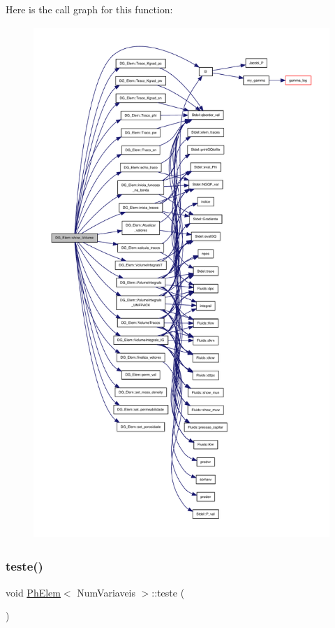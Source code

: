 Here is the call graph for this function\+:
\nopagebreak
\begin{figure}[H]
\begin{center}
\leavevmode
\includegraphics[height=550pt]{classDG__Elem_a01a49e07fd18a74e12eedf15cff7b8c7_cgraph}
\end{center}
\end{figure}
\mbox{\label{classPhElem_a9742fa2313cf25a24ae9c5602bd75ac0}} 
\subsubsection{\texorpdfstring{teste()}{teste()}}
{\footnotesize\ttfamily void \hyperlink{classPhElem}{Ph\+Elem}$<$ Num\+Variaveis $>$\+::teste (\begin{DoxyParamCaption}{ }\end{DoxyParamCaption})\hspace{0.3cm}{\ttfamily [inherited]}}



